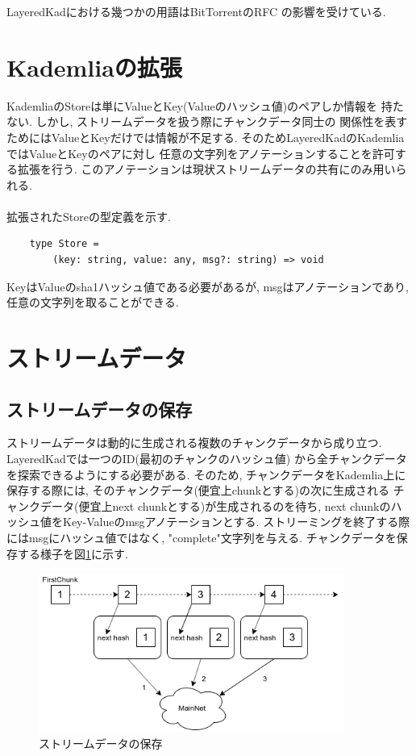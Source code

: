 \documentclass[sotsuron]{jcsie}
\begin{document}
LayeredKadにおける幾つかの用語はBitTorrentのRFC\cite{bep0000r38:online}
の影響を受けている.

\section{Kademliaの拡張}
KademliaのStoreは単にValueとKey(Valueのハッシュ値)のペアしか情報を
持たない.
しかし, ストリームデータを扱う際にチャンクデータ同士の
関係性を表すためにはValueとKeyだけでは情報が不足する.
そのためLayeredKadのKademliaではValueとKeyのペアに対し
任意の文字列をアノテーションすることを許可する拡張を行う.
このアノテーションは現状ストリームデータの共有にのみ用いられる.
\\\\
拡張されたStoreの型定義を示す.
\begin{lstlisting}
	type Store = 
		(key: string, value: any, msg?: string) => void
\end{lstlisting}
KeyはValueのsha1ハッシュ値である必要があるが, 
msgはアノテーションであり, 任意の文字列を取ることができる.

\section{ストリームデータ}
\subsection{ストリームデータの保存}
ストリームデータは動的に生成される複数のチャンクデータから成り立つ.
LayeredKadでは一つのID(最初のチャンクのハッシュ値)
から全チャンクデータを探索できるようにする必要がある.
そのため, チャンクデータをKademlia上に保存する際には, 
そのチャンクデータ(便宜上chunkとする)の次に生成される
チャンクデータ(便宜上next chunkとする)が生成されるのを待ち, 
next chunkのハッシュ値をKey-Valueのmsgアノテーションとする.
ストリーミングを終了する際にはmsgにハッシュ値ではなく, 
"complete"文字列を与える.
チャンクデータを保存する様子を図\ref{fig:streamdata}に示す.
\begin{figure}[H]
	\centering
	\includegraphics[width=10cm]{./assets/image/stream.png}
	\caption{ストリームデータの保存}
	\label{fig:streamdata}
\end{figure}
\end{document}
